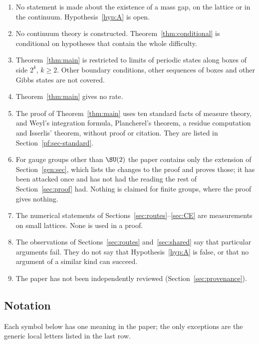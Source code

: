 \begin{enumerate}
\item No statement is made about the existence of a mass gap, on the lattice or in the continuum. Hypothesis~\ref{hyp:A} is open.
\item No continuum theory is constructed. Theorem~\ref{thm:conditional} is conditional on hypotheses that contain the whole difficulty.
\item Theorem~\ref{thm:main} is restricted to limits of periodic states along boxes of side $2^k$, $k\ge2$. Other boundary conditions, other sequences of boxes and other Gibbs states are not covered.
\item Theorem~\ref{thm:main} gives no rate.
\item The proof of Theorem~\ref{thm:main} uses ten standard facts of measure theory, and Weyl's integration formula, Plancherel's theorem, a residue computation and Isserlis' theorem, without proof or citation. They are listed in Section~\ref{pf:sec-standard}.
\item For gauge groups other than $\SU(2)$ the paper contains only the extension of Section~\ref{gen:sec}, which lists the changes to the proof and proves those; it has been attacked once and has not had the reading the rest of Section~\ref{sec:proof} had. Nothing is claimed for finite groups, where the proof gives nothing.
\item The numerical statements of Sections~\ref{sec:routes}--\ref{sec:CE} are measurements on small lattices. None is used in a proof.
\item The observations of Sections~\ref{sec:routes} and~\ref{sec:shared} say that particular arguments fail. They do not say that Hypothesis~\ref{hyp:A} is false, or that no argument of a similar kind can succeed.
\item The paper has not been independently reviewed (Section~\ref{sec:provenance}).
\end{enumerate}

\subsection*{Notation}
Each symbol below has one meaning in the paper; the only exceptions are the generic local letters listed in the last row.

